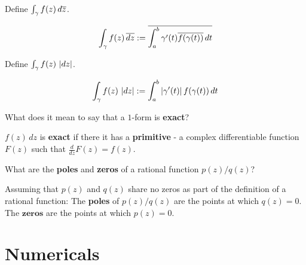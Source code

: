 \documentclass{homework}
\begin{document}
        \begin{problem}
          Define $\int_\gamma f(z) \, d\overline{z}$.
          \end{problem}
          \begin{solution}
          \begin{align*}
          \int_\gamma f(z) \, \overline{dz} &:= \overline{\int_{a}^b \gamma'(t)\overline{f(\gamma(t))} \, dt}\\
          \end{align*}

          \end{solution}
          \begin{problem}
            Define $\int_\gamma f(z) \, \left|dz\right|$.
            \end{problem}
            \begin{solution}
            \begin{align*}
            \int_\gamma f(z) \, \left|dz\right| &:= \int_{a}^b \left|\gamma'(t)\right|f(\gamma(t)) \,dt \\
            \end{align*}
            \end{solution}

            \begin{problem}
              What does it mean to say that a $1$-form is \textbf{exact}?
              \end{problem}
              \begin{solution}
              $f(z)\,dz$ is \textbf{exact} if there it has a \textbf{primitive} - a complex differentiable function $F(z)$ such that $\frac{d}{dz} F(z) = f(z)$.
              \end{solution}
              \begin{problem}
                What are the \textbf{poles} and \textbf{zeros} of a rational
                  function $p(z)/q(z)$?
                  \end{problem}
                  \begin{solution}
                  Assuming that $p(z)$ and $q(z)$ share no zeros as part of the definition of a rational function:
                  The \textbf{poles} of $p(z)/q(z)$ are the points at which $q(z)=0$. The $\textbf{zeros}$ are the points at which $p(z)=0$.
                  \end{solution}

                  \section{Numericals}
\end{document}
